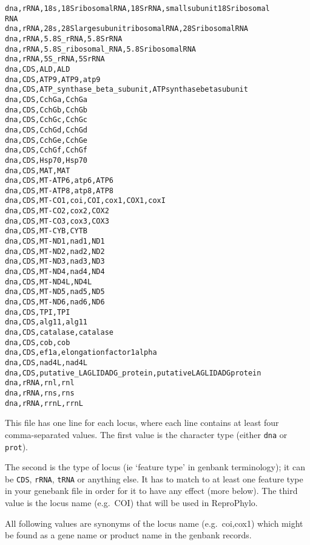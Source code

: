 \documentclass[letterpaper,10pt,english]{/usr/share/sphinx/texinputs/sphinxhowto}
\newenvironment{InvisibleVerbatim}
        {\begin{mdframed}[leftmargin=0.1\linewidth,innerleftmargin=3pt,innerrightmargin=3pt, userdefinedwidth=1\linewidth, linewidth=0pt, linecolor=white, usetwoside=false]}
        {\end{mdframed}}
\begin{document}
    

        
        

            
                \begin{InvisibleVerbatim}
                \vspace{-0.5\baselineskip}
\begin{alltt}dna,rRNA,18s,18S ribosomal RNA,18S rRNA,small subunit 18S ribosomal
RNA
dna,rRNA,28s,28S large subunit ribosomal RNA,28S ribosomal RNA
dna,rRNA,5.8S\_rRNA,5.8S rRNA
dna,rRNA,5.8S\_ribosomal\_RNA,5.8S ribosomal RNA
dna,rRNA,5S\_rRNA,5S rRNA
dna,CDS,ALD,ALD
dna,CDS,ATP9,ATP9,atp9
dna,CDS,ATP\_synthase\_beta\_subunit,ATP synthase beta subunit
dna,CDS,CchGa,CchGa
dna,CDS,CchGb,CchGb
dna,CDS,CchGc,CchGc
dna,CDS,CchGd,CchGd
dna,CDS,CchGe,CchGe
dna,CDS,CchGf,CchGf
dna,CDS,Hsp70,Hsp70
dna,CDS,MAT,MAT
dna,CDS,MT-ATP6,atp6,ATP6
dna,CDS,MT-ATP8,atp8,ATP8
dna,CDS,MT-CO1,coi,COI,cox1,COX1,coxI
dna,CDS,MT-CO2,cox2,COX2
dna,CDS,MT-CO3,cox3,COX3
dna,CDS,MT-CYB,CYTB
dna,CDS,MT-ND1,nad1,ND1
dna,CDS,MT-ND2,nad2,ND2
dna,CDS,MT-ND3,nad3,ND3
dna,CDS,MT-ND4,nad4,ND4
dna,CDS,MT-ND4L,ND4L
dna,CDS,MT-ND5,nad5,ND5
dna,CDS,MT-ND6,nad6,ND6
dna,CDS,TPI,TPI
dna,CDS,alg11,alg11
dna,CDS,catalase,catalase
dna,CDS,cob,cob
dna,CDS,ef1a,elongation factor 1 alpha
dna,CDS,nad4L,nad4L
dna,CDS,putative\_LAGLIDADG\_protein,putative LAGLIDADG protein
dna,rRNA,rnl,rnl
dna,rRNA,rns,rns
dna,rRNA,rrnL,rrnL
\end{alltt}

            \end{InvisibleVerbatim}
            
        
    
This file has one line for each locus, where each line contains at least
four comma-separated values. The first value is the character type
(either \texttt{dna} or \texttt{prot}).

The second is the type of locus (ie `feature type' in genbank
terminology); it can be \texttt{CDS}, \texttt{rRNA}, \texttt{tRNA} or
anything else. It has to match to at least one feature type in your
genebank file in order for it to have any effect (more below). The third
value is the locus name (e.g.~COI) that will be used in ReproPhylo.

All following values are synonyms of the locus name (e.g.~coi,cox1)
which might be found as a gene name or product name in the genbank
records.
\end{document}
